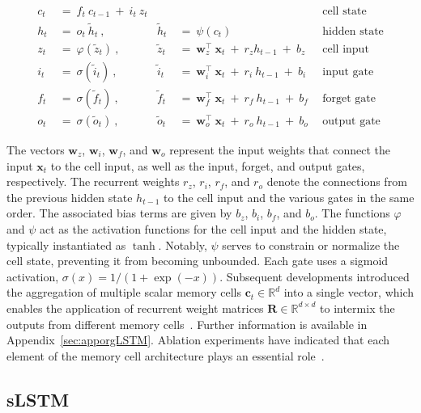 \begin{align}
c_t \ &= \  f_t \ c_{t-1} \ + \ i_t \ z_t &  & &\text{cell state} \\
h_t  \ &= \ o_t \ \tilde{h}_t \ , & \tilde{h}_t \ &= \ \psi \left( c_t\right)
  &\text{hidden state} \\
z_t \ &= \ \varphi \left( \tilde{z}_t \right) \ , 
  &\tilde{z}_t \ &=  \ \mathbf{w}^\top_{z} \ \mathbf{x}_t \ + \
  r_{z}  h_{t-1} \ + \  b_{z} \ \
  &\text{cell input} \\
i_t \ &= \ \sigma \left( \tilde{i}_t  \right) \ , 
  &\tilde{i}_t \ &= \ \mathbf{w}^\top_{i} \ \mathbf{x}_t \ + \
  r_{i}  \ h_{t-1} \ + \  b_{i} \ \
  &\text{input gate} \\
f_t \ &= \ \sigma \left(  \tilde{f}_t \right) \ , 
  &\tilde{f}_t \ &= \ \mathbf{w}^\top_{f} \ \mathbf{x}_t  \ + \
  r_{f}  \ h_{t-1} \ + \  b_{f} \ \
  &\text{forget gate} \\
o_t \ &= \ \sigma \left( \tilde{o}_t \right) \ , 
  &\tilde{o}_t  \ &= \ \mathbf{w}^\top_{o} \ \mathbf{x}_t \ + \
  r_{o}  \ h_{t-1} \ + \  b_{o} \ \
  &\text{output gate} 
\end{align}

The vectors $\mathbf{w}_{z}$, $\mathbf{w}_{i}$, $\mathbf{w}_{f}$, and $\mathbf{w}_{o}$ represent the input weights that connect the input $\mathbf{x}_t$ to the cell input, as well as the input, forget, and output gates, respectively. The recurrent weights $r_{z}$, $r_{i}$, $r_{f}$, and $r_{o}$ denote the connections from the previous hidden state $h_{t-1}$ to the cell input and the various gates in the same order. The associated bias terms are given by $b_{z}$, $b_{i}$, $b_{f}$, and $b_{o}$. The functions $\varphi$ and $\psi$ act as the activation functions for the cell input and the hidden state, typically instantiated as $\tanh$. Notably, $\psi$ serves to constrain or normalize the cell state, preventing it from becoming unbounded. Each gate uses a sigmoid activation, $\sigma \left( x \right)= 1/(1+\exp(-x))$. Subsequent developments introduced the aggregation of multiple scalar memory cells $\mathbf{c}_t \in \mathbb{R}^{d}$ into a single vector, which enables the application of recurrent weight matrices $\mathbf{R} \in \mathbb{R}^{d \times d}$ to intermix the outputs from different memory cells~\citep{Greff:15}. Further information is available in Appendix~\ref{sec:apporgLSTM}. Ablation experiments have indicated that each element of the memory cell architecture plays an essential role~\citep{Greff:15}.

\subsection{sLSTM}
\label{sec:sLSTM}

